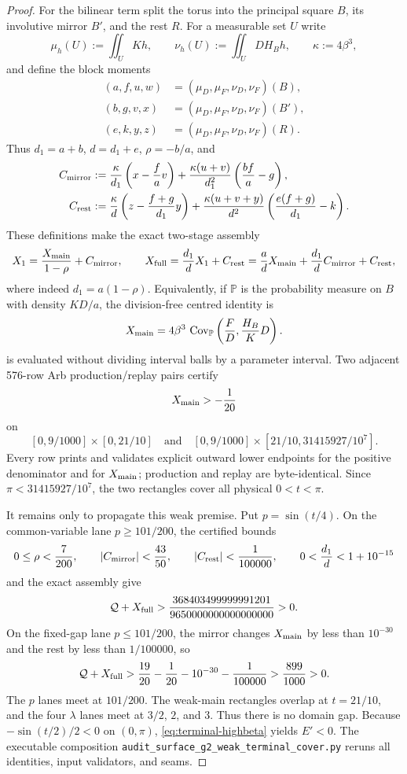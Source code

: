 \documentclass[11pt]{article}
\theoremstyle{remark}
\begin{document}
\begin{proof}
For the bilinear term split the torus into the principal square $B$,
its involutive mirror $B'$, and the rest $R$.  For a measurable set $U$ write
\[
 \mu_h(U):=\iint_U Kh,\qquad
 \nu_h(U):=\iint_U D H_B h,\qquad \kappa:=4\beta^3,
\]
and define the block moments
\[
\begin{aligned}
 (a,f,u,w)&=(\mu_D,\mu_F,\nu_D,\nu_F)(B),\\
 (b,g,v,x)&=(\mu_D,\mu_F,\nu_D,\nu_F)(B'),\\
 (e,k,y,z)&=(\mu_D,\mu_F,\nu_D,\nu_F)(R).
\end{aligned}
\]
Thus $d_1=a+b$, $d=d_1+e$, $\rho=-b/a$, and
\[
\begin{aligned}
 C_{\rm mirror}
  &:=\frac{\kappa}{d_1}\left(x-\frac{f}{a}v\right)
    +\frac{\kappa(u+v)}{d_1^2}\left(\frac{bf}{a}-g\right),\\
 C_{\rm rest}
  &:=\frac{\kappa}{d}\left(z-\frac{f+g}{d_1}y\right)
    +\frac{\kappa(u+v+y)}{d^2}
       \left(\frac{e(f+g)}{d_1}-k\right).
\end{aligned}
\]
These definitions make the exact two-stage assembly
\[
 X_1=\frac{X_{\rm main}}{1-\rho}+C_{\rm mirror},
 \qquad
 X_{\rm full}
 =\frac{d_1}{d}X_1+C_{\rm rest}
 =\frac{a}{d}X_{\rm main}
  +\frac{d_1}{d}C_{\rm mirror}+C_{\rm rest},
\]
where indeed $d_1=a(1-\rho)$.  Equivalently, if $\mathbb P$ is the
probability measure on $B$ with density $KD/a$, the division-free centred
identity is
\[
 X_{\rm main}
 =4\beta^3\,\operatorname{Cov}_{\mathbb P}
 \left(\frac{F}{D},\frac{H_B}{K}D\right).
\]
is evaluated without dividing interval balls by a parameter interval.
Two adjacent 576-row Arb production/replay pairs certify
\[
 X_{\rm main}>-\frac1{20}
\]
on
\[
 [0,9/1000]\times[0,21/10]
 \quad\text{and}\quad
 [0,9/1000]\times
 [21/10,31415927/10^7].
\]
Every row prints and validates explicit outward lower endpoints for the
positive denominator and for $X_{\rm main}$; production and replay are
byte-identical.  Since $\pi<31415927/10^7$, the two rectangles cover all
physical $0<t<\pi$.

It remains only to propagate this weak premise.  Put $p=\sin(t/4)$.  On the
common-variable lane $p\ge101/200$, the certified bounds
\[
 0\le\rho<\frac7{200},\qquad
 |C_{\rm mirror}|<\frac{43}{50},\qquad
 |C_{\rm rest}|<\frac1{100000},\qquad
 0<\frac{d_1}{d}<1+10^{-15}
\]
and the exact assembly give
\[
 {\cal Q}+X_{\rm full}>
 \frac{368403499999991201}{9650000000000000000}>0.
\]
On the fixed-gap lane $p\le101/200$, the mirror changes
$X_{\rm main}$ by less than $10^{-30}$ and the rest by less than
$1/100000$, so
\[
 {\cal Q}+X_{\rm full}>
 \frac{19}{20}-\frac1{20}-10^{-30}-\frac1{100000}
 >\frac{899}{1000}>0.
\]
The $p$ lanes meet at $101/200$.  The weak-main rectangles overlap at
$t=21/10$, and the four $\lambda$ lanes meet at $3/2$, $2$, and $3$.
Thus there is no domain gap.  Because $-\sin(t/2)/2<0$ on $(0,\pi)$,
\eqref{eq:terminal-highbeta} yields $E'<0$.  The executable composition
\texttt{audit\_surface\_g2\_weak\_terminal\_cover.py} reruns all
identities, input validators, and seams.


\end{proof}
\end{document}
